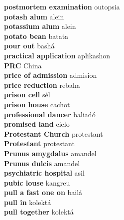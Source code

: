 \textbf{ postmortem examination  } outopsia \\
\textbf{ potash alum  } alein \\
\textbf{ potassium alum  } alein \\
\textbf{ potato bean  } batata \\
\textbf{ pour out  } bashá \\
\textbf{ practical application  } aplikashon \\
\textbf{ PRC  } China \\
\textbf{ price of admission  } admision \\
\textbf{ price reduction  } rebaha \\
\textbf{ prison cell  } sèl \\
\textbf{ prison house  } cachot \\
\textbf{ professional dancer  } baliadó \\
\textbf{ promised land  } cielo \\
\textbf{ Protestant Church  } protestant \\
\textbf{ Protestant  } protestant \\
\textbf{ Prunus amygdalus  } amandel \\
\textbf{ Prunus dulcis  } amandel \\
\textbf{ psychiatric hospital  } asil \\
\textbf{ pubic louse  } kangreu \\
\textbf{ pull a fast one on  } bailá \\
\textbf{ pull in  } kolektá \\
\textbf{ pull together  } kolektá \\
